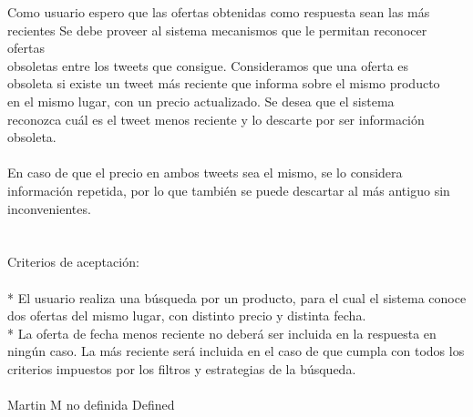 	{Como usuario espero que las ofertas obtenidas como respuesta sean las más recientes} %
	{Se debe proveer al sistema mecanismos que le permitan reconocer ofertas\\
obsoletas entre los tweets que consigue. Consideramos que una oferta es\\
obsoleta si existe un tweet más reciente que informa sobre el mismo producto\\
en el mismo lugar, con un precio actualizado. Se desea que el sistema\\
reconozca cuál es el tweet menos reciente y lo descarte por ser información\\
obsoleta.\\
\\
En caso de que el precio en ambos tweets sea el mismo, se lo considera\\
información repetida, por lo que también se puede descartar al más antiguo sin\\
inconvenientes.\\
\\
  \\
Criterios de aceptación:\\
\\
* El usuario realiza una búsqueda por un producto, para el cual el sistema conoce dos ofertas del mismo lugar, con distinto precio y distinta fecha.  \\
* La oferta de fecha menos reciente no deberá ser incluida en la respuesta en ningún caso. La más reciente será incluida en el caso de que cumpla con todos los criterios impuestos por los filtros y estrategias de la búsqueda.\\
\\
} %
	{} %
	{} %
	{Martin M} %
	{no definida} %
	{Defined} %


\vspace{20pt}

